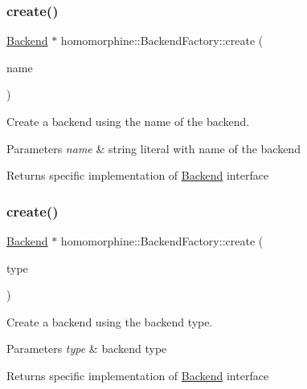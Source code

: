 \subsubsection{\texorpdfstring{create()}{create()}\hspace{0.1cm}{\footnotesize\ttfamily [1/2]}}
{\footnotesize\ttfamily \mbox{\hyperlink{classhomomorphine_1_1_backend}{Backend}} $\ast$ homomorphine\+::\+Backend\+Factory\+::create (\begin{DoxyParamCaption}\item[{string}]{name }\end{DoxyParamCaption})\hspace{0.3cm}{\ttfamily [static]}}

Create a backend using the name of the backend.


\begin{DoxyParams}{Parameters}
{\em name} & string literal with name of the backend \\
\hline
\end{DoxyParams}
\begin{DoxyReturn}{Returns}
specific implementation of \mbox{\hyperlink{classhomomorphine_1_1_backend}{Backend}} interface 
\end{DoxyReturn}
\mbox{\label{classhomomorphine_1_1_backend_factory_a5956ea2aa0baed370946aea57bfcc45d}} 
\subsubsection{\texorpdfstring{create()}{create()}\hspace{0.1cm}{\footnotesize\ttfamily [2/2]}}
{\footnotesize\ttfamily \mbox{\hyperlink{classhomomorphine_1_1_backend}{Backend}} $\ast$ homomorphine\+::\+Backend\+Factory\+::create (\begin{DoxyParamCaption}\item[{Backend\+Type}]{type }\end{DoxyParamCaption})\hspace{0.3cm}{\ttfamily [static]}}

Create a backend using the backend type.


\begin{DoxyParams}{Parameters}
{\em type} & backend type \\
\hline
\end{DoxyParams}
\begin{DoxyReturn}{Returns}
specific implementation of \mbox{\hyperlink{classhomomorphine_1_1_backend}{Backend}} interface 
\end{DoxyReturn}
\mbox{\label{classhomomorphine_1_1_backend_factory_a4e0ca8f0c2ce59e13955b7d4fbdf4820}} 
